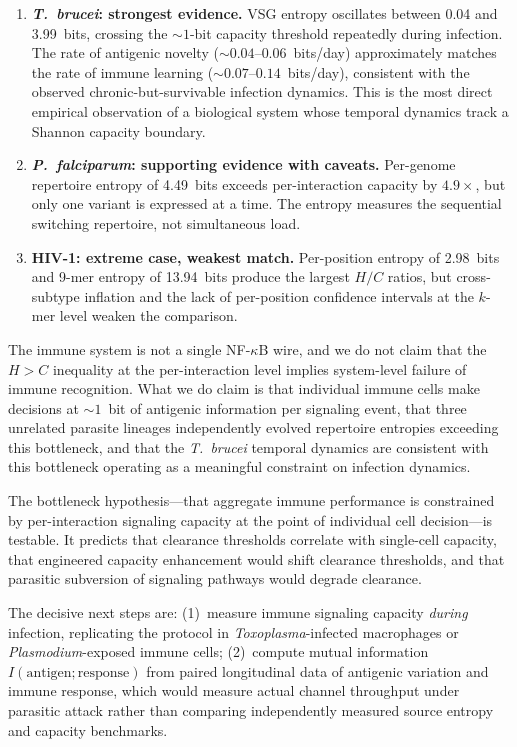 \documentclass[twocolumn,10pt]{article}
\begin{document}
\begin{enumerate}
\item \textbf{\textit{T.~brucei}: strongest evidence.}  VSG entropy oscillates between 0.04 and 3.99~bits, crossing the ${\sim}1$-bit capacity threshold repeatedly during infection.  The rate of antigenic novelty (${\sim}0.04\text{--}0.06$~bits/day) approximately matches the rate of immune learning (${\sim}0.07\text{--}0.14$~bits/day), consistent with the observed chronic-but-survivable infection dynamics.  This is the most direct empirical observation of a biological system whose temporal dynamics track a Shannon capacity boundary.

\item \textbf{\textit{P.~falciparum}: supporting evidence with caveats.}  Per-genome repertoire entropy of 4.49~bits exceeds per-interaction capacity by $4.9\times$, but only one variant is expressed at a time.  The entropy measures the sequential switching repertoire, not simultaneous load.

\item \textbf{HIV-1: extreme case, weakest match.}  Per-position entropy of 2.98~bits and 9-mer entropy of 13.94~bits produce the largest $H/C$ ratios, but cross-subtype inflation and the lack of per-position confidence intervals at the $k$-mer level weaken the comparison.
\end{enumerate}

The immune system is not a single NF-$\kappa$B wire, and we do not claim that the $H > C$ inequality at the per-interaction level implies system-level failure of immune recognition.  What we do claim is that individual immune cells make decisions at ${\sim}1$~bit of antigenic information per signaling event, that three unrelated parasite lineages independently evolved repertoire entropies exceeding this bottleneck, and that the \textit{T.~brucei} temporal dynamics are consistent with this bottleneck operating as a meaningful constraint on infection dynamics.

The bottleneck hypothesis---that aggregate immune performance is constrained by per-interaction signaling capacity at the point of individual cell decision---is testable.  It predicts that clearance thresholds correlate with single-cell capacity, that engineered capacity enhancement would shift clearance thresholds, and that parasitic subversion of signaling pathways would degrade clearance.

The decisive next steps are: (1)~measure immune signaling capacity \emph{during} infection, replicating the \citet{cheong2011} protocol in \textit{Toxoplasma}-infected macrophages or \textit{Plasmodium}-exposed immune cells; (2)~compute mutual information $I(\text{antigen}; \text{response})$ from paired longitudinal data of antigenic variation and immune response, which would measure actual channel throughput under parasitic attack rather than comparing independently measured source entropy and capacity benchmarks.
\end{document}

